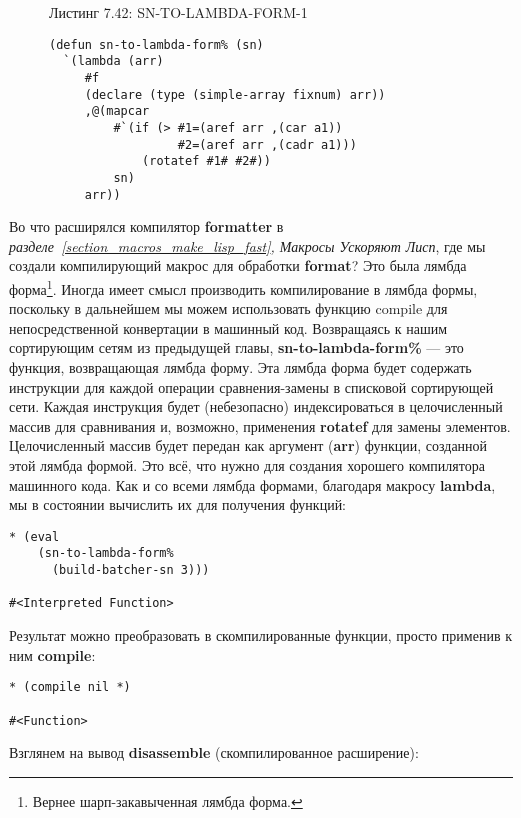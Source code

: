 \begin{figure}Листинг 7.42: SN-TO-LAMBDA-FORM-1\label{listing_7.42}
\listbegin
\begin{verbatim}
(defun sn-to-lambda-form% (sn)
  `(lambda (arr)
     #f
     (declare (type (simple-array fixnum) arr))
     ,@(mapcar
         #`(if (> #1=(aref arr ,(car a1))
                  #2=(aref arr ,(cadr a1)))
             (rotatef #1# #2#))
         sn)
     arr))
\end{verbatim}
\listend
\end{figure}

Во что расширялся компилятор \textbf{formatter} в \emph{разделе~\ref{section_macros_make_lisp_fast}, Макросы Ускоряют Лисп}, где мы создали компилирующий макрос для обработки \textbf{format}? Это была лямбда форма\footnote{Вернее шарп-закавыченная лямбда форма.}. Иногда имеет смысл производить компилирование в лямбда формы, поскольку в дальнейшем мы можем использовать функцию compile для непосредственной конвертации в машинный код. Возвращаясь к нашим сортирующим сетям из предыдущей главы, \textbf{sn-to-lambda-form\%} --- это функция, возвращающая лямбда форму. Эта лямбда форма будет содержать инструкции для каждой операции сравнения-замены в списковой сортирующей сети. Каждая инструкция будет (небезопасно) индексироваться в целочисленный массив для сравнивания и, возможно, применения \textbf{rotatef} для замены элементов. Целочисленный массив будет передан как аргумент (\textbf{arr}) функции, созданной этой лямбда формой. Это всё, что нужно для создания хорошего компилятора машинного кода. Как и со всеми лямбда формами, благодаря макросу \textbf{lambda}, мы в состоянии вычислить их для получения функций:

\begin{verbatim}
* (eval
    (sn-to-lambda-form%
      (build-batcher-sn 3)))

#<Interpreted Function>
\end{verbatim}

Результат можно преобразовать в скомпилированные функции, просто применив к ним \textbf{compile}:

\begin{verbatim}
* (compile nil *)

#<Function>
\end{verbatim}

Взглянем на вывод \textbf{disassemble} (скомпилированное расширение):


